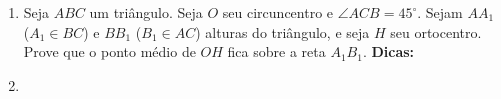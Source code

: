 \documentclass{article}
\newcommand{\dica}{\textbf{Dicas:}}
\newcommand{\iniTri}{Seja $ABC$ um triângulo}
\begin{document}
\begin{multicols}{2}
\begin{enumerate}
    \item \iniTri. Seja $O$ seu circuncentro e $\angle ACB=45^{\circ}$. Sejam $AA_1$ ($A_1\in BC$) e $BB_1$ ($B_1\in AC$) alturas do triângulo, e seja $H$ seu ortocentro. Prove que o ponto médio de $OH$ fica sobre a reta $A_1B_1$. \dica %
    
    \item
    
    
    
    
    
    
    
    
    
\end{enumerate}
\end{multicols}
\end{document}
